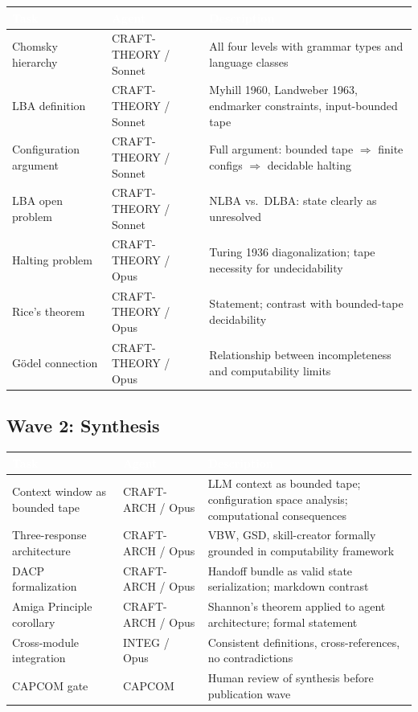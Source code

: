 \documentclass[11pt,letterpaper]{article}
\newcommand{\tableheader}[1]{\textbf{\sffamily\textcolor{white}{#1}}}
\begin{document}
\begin{center}
\begin{tabularx}{\textwidth}{L{3.5cm}L{2.5cm}X}
\toprule
{}
\tableheader{Task} & \tableheader{Agent} & \tableheader{Description} \\
\midrule
Chomsky hierarchy & CRAFT-THEORY / Sonnet & All four levels with grammar types and language classes \\
LBA definition & CRAFT-THEORY / Sonnet & Myhill 1960, Landweber 1963, endmarker constraints, input-bounded tape \\
Configuration argument & CRAFT-THEORY / Sonnet & Full argument: bounded tape $\Rightarrow$ finite configs $\Rightarrow$ decidable halting \\
LBA open problem & CRAFT-THEORY / Sonnet & NLBA vs.\ DLBA: state clearly as unresolved \\
Halting problem & CRAFT-THEORY / Opus & Turing 1936 diagonalization; tape necessity for undecidability \\
Rice's theorem & CRAFT-THEORY / Opus & Statement; contrast with bounded-tape decidability \\
G\"{o}del connection & CRAFT-THEORY / Opus & Relationship between incompleteness and computability limits \\
\bottomrule
\end{tabularx}
\end{center}

\subsection{Wave 2: Synthesis}

\begin{center}
\begin{tabularx}{\textwidth}{L{3.5cm}L{2.5cm}X}
\toprule
{}
\tableheader{Task} & \tableheader{Agent} & \tableheader{Description} \\
\midrule
Context window as bounded tape & CRAFT-ARCH / Opus & LLM context as bounded tape; configuration space analysis; computational consequences \\
Three-response architecture & CRAFT-ARCH / Opus & VBW, GSD, skill-creator formally grounded in computability framework \\
DACP formalization & CRAFT-ARCH / Opus & Handoff bundle as valid state serialization; markdown contrast \\
Amiga Principle corollary & CRAFT-ARCH / Opus & Shannon's theorem applied to agent architecture; formal statement \\
Cross-module integration & INTEG / Opus & Consistent definitions, cross-references, no contradictions \\
CAPCOM gate & CAPCOM & Human review of synthesis before publication wave \\
\bottomrule
\end{tabularx}
\end{center}
\end{document}
